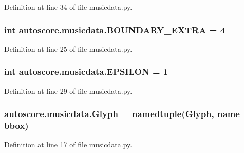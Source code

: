 Definition at line 34 of file musicdata.\+py.

\subsubsection[{\texorpdfstring{B\+O\+U\+N\+D\+A\+R\+Y\+\_\+\+E\+X\+T\+RA}{BOUNDARY_EXTRA}}]{\setlength{\rightskip}{0pt plus 5cm}int autoscore.\+musicdata.\+B\+O\+U\+N\+D\+A\+R\+Y\+\_\+\+E\+X\+T\+RA = 4}\hypertarget{namespaceautoscore_1_1musicdata_a5b8b64595027a20c59f8323de8526e30}{}\label{namespaceautoscore_1_1musicdata_a5b8b64595027a20c59f8323de8526e30}


Definition at line 25 of file musicdata.\+py.

\subsubsection[{\texorpdfstring{E\+P\+S\+I\+L\+ON}{EPSILON}}]{\setlength{\rightskip}{0pt plus 5cm}int autoscore.\+musicdata.\+E\+P\+S\+I\+L\+ON = 1}\hypertarget{namespaceautoscore_1_1musicdata_a355d8fb1a4b75793b64381e7097d51b7}{}\label{namespaceautoscore_1_1musicdata_a355d8fb1a4b75793b64381e7097d51b7}


Definition at line 29 of file musicdata.\+py.

\subsubsection[{\texorpdfstring{Glyph}{Glyph}}]{\setlength{\rightskip}{0pt plus 5cm}autoscore.\+musicdata.\+Glyph = namedtuple(\textquotesingle{}Glyph\textquotesingle{}, \textquotesingle{}name bbox\textquotesingle{})}\hypertarget{namespaceautoscore_1_1musicdata_a54a64afd77bd1565c3680deb249d3d6a}{}\label{namespaceautoscore_1_1musicdata_a54a64afd77bd1565c3680deb249d3d6a}


Definition at line 17 of file musicdata.\+py.

